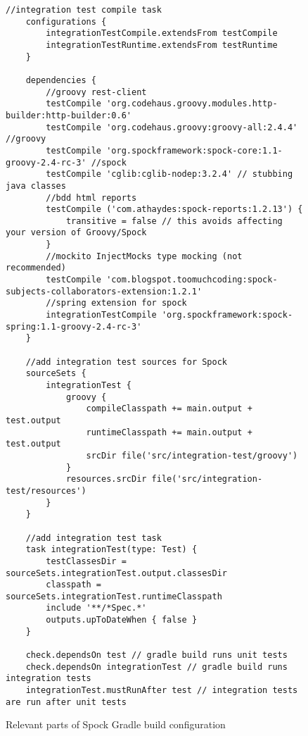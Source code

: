 \begin{figure}[H]
    \begin{lstlisting}[style=java]
    //integration test compile task
    configurations {
        integrationTestCompile.extendsFrom testCompile
        integrationTestRuntime.extendsFrom testRuntime
    }

    dependencies {
        //groovy rest-client
        testCompile 'org.codehaus.groovy.modules.http-builder:http-builder:0.6'
        testCompile 'org.codehaus.groovy:groovy-all:2.4.4' //groovy
        testCompile 'org.spockframework:spock-core:1.1-groovy-2.4-rc-3' //spock
        testCompile 'cglib:cglib-nodep:3.2.4' // stubbing java classes
        //bdd html reports
        testCompile ('com.athaydes:spock-reports:1.2.13') {
            transitive = false // this avoids affecting your version of Groovy/Spock
        }
        //mockito InjectMocks type mocking (not recommended)
        testCompile 'com.blogspot.toomuchcoding:spock-subjects-collaborators-extension:1.2.1'
        //spring extension for spock
        integrationTestCompile 'org.spockframework:spock-spring:1.1-groovy-2.4-rc-3'
    }

    //add integration test sources for Spock
    sourceSets {
        integrationTest {
            groovy {
                compileClasspath += main.output + test.output
                runtimeClasspath += main.output + test.output
                srcDir file('src/integration-test/groovy')
            }
            resources.srcDir file('src/integration-test/resources')
        }
    }

    //add integration test task
    task integrationTest(type: Test) {
        testClassesDir = sourceSets.integrationTest.output.classesDir
        classpath = sourceSets.integrationTest.runtimeClasspath
        include '**/*Spec.*'
        outputs.upToDateWhen { false }
    }

    check.dependsOn test // gradle build runs unit tests
    check.dependsOn integrationTest // gradle build runs integration tests
    integrationTest.mustRunAfter test // integration tests are run after unit tests
    \end{lstlisting}
    \caption{Relevant parts of Spock Gradle build configuration}
    \label{fig:spock-build}
\end{figure}

